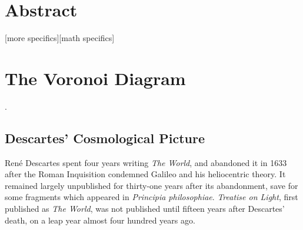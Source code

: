 \documentclass[12pt,twoside]{reedthesis}
\begin{document}
    \tableofcontents
    \listofalgorithms
    \listoffigures

    \chapter*{Abstract}
    [more specifics][math specifics]
	

  \mainmatter %
  \pagestyle{fancyplain} %


  \chapter*{The Voronoi Diagram}
    \setcounter{chapter}{1}
    \setcounter{section}{0}

  \citep[][p. 21]{descartes}.

  \section{Descartes' Cosmological Picture} %
  \label{sec:the_world}
    Ren\'{e} Descartes spent four years writing \emph{The World}, and abandoned it in 1633 after the Roman Inquisition condemned Galileo and his heliocentric theory. It remained largely unpublished for thirty-one years after its abandonment, save for some fragments which appeared in \emph{Principia philosophiae}. \emph{Treatise on Light}, first published as \emph{The World}, was not published until fifteen years after Descartes' death, on a leap year almost four hundred years ago. \par
\end{document}
